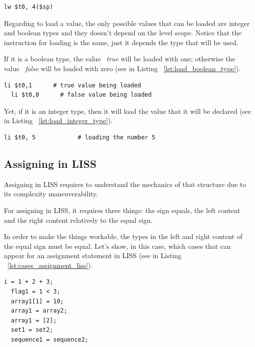 \documentclass[
  oneside,
  11pt, a4paper,
  footinclude=true,
  headinclude=true,
  cleardoublepage=empty
]{scrbook}
\begin{document}
\begin{lstlisting}[caption={Loading a variable with level scope greater than zero},label={lst:load_variable_level_scope_great_0}]
  lw $t0, 4($sp)
\end{lstlisting}

Regarding to load a value, the only possible values that can be loaded are integer and boolean types and they doesn't depend on the level scope.
Notice that the instruction for loading is the same, just it depends the type that will be used.

If it is a boolean type, the value ~\textit{true} will be loaded with one; otherwise the value ~\textit{false} will be loaded with zero (see in Listing ~\ref{lst:load_boolean_type}).

\begin{lstlisting}[caption={Loading a boolean value},label={lst:load_boolean_type}]
  li $t0,1		# true value being loaded
  li $t0,0		# false value being loaded
\end{lstlisting}

Yet, if it is an integer type, then it will load the value that it will be declared (see in Listing ~\ref{lst:load_integer_type}).

\begin{lstlisting}[caption={Loading an integer value},label={lst:load_integer_type}]
  li $t0, 5            # loading the number 5
\end{lstlisting}

\subsection{Assigning in LISS}

Assigning in LISS requires to understand the mechanics of that structure due to its complexity maneuverability.

For assigning in LISS, it requires three things: the sign equals, the left content and the right content relatively to the equal sign.

In order to make the things workable, the types in the left and right content of the equal sign must be equal.
Let's show, in this case, which cases that can appear for an assignment statement in LISS (see in Listing ~\ref{lst:cases_assignment_liss}).

\begin{lstlisting}[caption={Examples of assignment for different types in LISS},label={lst:cases_assignment_liss}]
  i = 1 + 2 + 3;
  flag1 = 1 < 3;
  array1[1] = 10;
  array1 = array2;
  array1 = [2];
  set1 = set2;
  sequence1 = sequence2;
\end{lstlisting}
\end{document}
